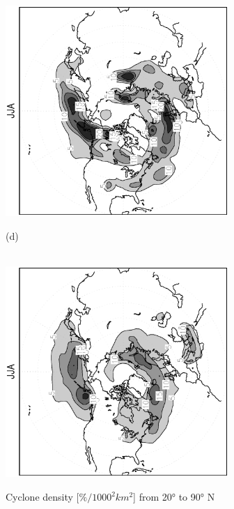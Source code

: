 \documentclass[12pt,a4paper,twoside,openright,headinclude,liststotoc,bibtotoc]{scrreprt}
\begin{document}
\begin{figure}[b]
{\includegraphics[height=8.0cm,angle=-90]
{eps/cycldensity_PLASIM_T21_45JJA.eps}
}
\parbox{8.5cm}{\hspace{0.95cm}\begin{scriptsize}(d)\end{scriptsize} \vspace{-0.5cm} \\
\includegraphics[height=8.0cm,angle=-90]
{eps/cycldensity_ERA40_T21_45JJA.eps}
}
\caption[Cyclone density Northern Hemisphere]{Cyclone density [$\%/1000^2 km^2$] from 20° to 90° N}
\label{img:NHcyclden}
\end{figure}
\end{document}
